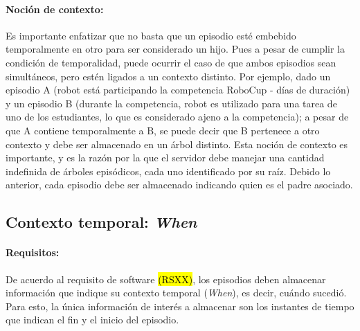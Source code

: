 \paragraph{Noción de contexto:}
Es importante enfatizar que no basta que un episodio esté embebido temporalmente en otro para ser considerado un hijo. Pues a pesar de cumplir la condición de temporalidad, puede ocurrir el caso de que ambos episodios sean simultáneos, pero estén ligados a un contexto distinto. Por ejemplo, dado un episodio A (robot está participando la competencia RoboCup - días de duración) y un episodio B (durante la competencia, robot es utilizado para una tarea de uno de los estudiantes, lo que es considerado ajeno a la competencia); a pesar de que A contiene temporalmente a B, se puede decir que B pertenece a otro contexto y debe ser almacenado en un árbol distinto. Esta noción de contexto es importante, y es la razón por la que el servidor debe manejar una cantidad indefinida de árboles episódicos, cada uno identificado por su raíz. Debido lo anterior, cada episodio debe ser almacenado indicando quien es el padre asociado.

 
 
\subsection{Contexto temporal: \textit{When}}\label{sec:design_ep_when}

\paragraph{Requisitos:}
De acuerdo al requisito de software \hl{(RSXX)}, los episodios deben almacenar información que indique su contexto temporal (\textit{When}), es decir, cuándo  sucedió. Para esto, la única información de interés a almacenar son los instantes de tiempo que indican el fin y el inicio del episodio.

